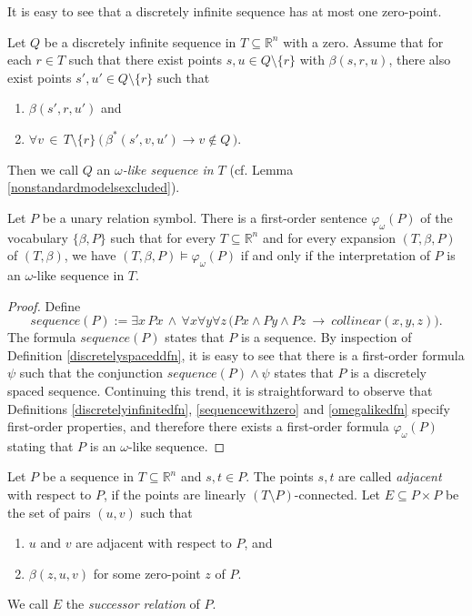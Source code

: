 \documentclass{LMCS}
\theoremstyle{plain}
\newcommand{\rp}{(\mathbb{R}^n,\beta)}
\newcommand{\rsq}{\mathbb{R}^n}
\newcommand{\mi}{\mathit}
\begin{document}
%
It is easy to see that a discretely infinite sequence has at most one zero-point.
%


%
\begin{defi}\label{omegalikedfn}
%
Let $Q$ be a discretely infinite sequence in $T\subseteq\rsq$ with a zero.
%
Assume that for each $r\in T$ such that there exist points $s,u\in Q\setminus\{r\}$
%
with $\beta(s,r,u)$, there also exist points $s',u'\in Q\setminus\{r\}$ such that
%
\begin{enumerate}
%
\item
$\beta(s',r,u')$ and
%
\item
$\forall v\, \in\, T\setminus\{r\}\ \bigl(\, \beta^*(s',v,u')\rightarrow v\not\in Q\, \bigr)$.
%
\end{enumerate}
%
%
%
Then we call $Q$ an \emph{$\omega$-like sequence in $T$} (cf. Lemma \ref{nonstandardmodelsexcluded}).
%
\end{defi}
%
%
%
%
%
%
\begin{lem}\label{omegalikesequencedefinability}
%
Let $P$ be a unary relation symbol. There is a first-order sentence $\varphi_{\omega}(P)$ of the vocabulary $\{\beta,P\}$ such that
%
for every $T\subseteq \rsq$ and for every expansion $(T,\beta,P)$ of $(T,\beta)$, we have $(T,\beta,P)\models\varphi_{\omega}(P)$ if and only if the
%
interpretation of $P$ is an $\omega$-like sequence in $T$.  
%
\end{lem}
%
%
%
\begin{proof} 
%
%
%
Define
%
%
%
\[
%
\mi{sequence}(P):=\exists x\, Px\,
%
\wedge\, \forall x\forall y\forall z\,
%
\bigl(Px\wedge Py \wedge Pz\ \rightarrow\ \mi{collinear}(x,y,z)\bigr).
%
\]
%
%
%
The formula $sequence(P)$ states that $P$ is a sequence. By inspection of Definition \ref{discretelyspaceddfn}, it is
%
easy to see that there is a first-order formula $\psi$ such that the conjunction $sequence(P)\wedge\psi$ states
%
that $P$ is a discretely spaced sequence. Continuing this trend, it is straightforward to observe
%
that Definitions \ref{discretelyinfinitedfn}, \ref{sequencewithzero} and \ref{omegalikedfn} specify
%
first-order properties, and therefore there exists a first-order formula $\varphi_{\omega}(P)$ stating
%
that $P$ is an $\omega$-like sequence.
%
\end{proof}
%



%
\begin{defi}\label{successordefinition}
%
Let $P$ be a sequence in $T\subseteq \rsq$ and $s,t\in P$. The points $s,t$ are
%
called \emph{adjacent} with respect to $P$, if the
%
points are linearly $(T\setminus P)$-connected.
%
Let $E\subseteq P\times P$ be the set of pairs $(u,v)$ such that 
%
\begin{enumerate}
%
\item
$u$ and $v$ are adjacent with respect to $P$, and 
%
\item
$\beta(z,u,v)$ for some zero-point $z$ of $P$.
%
\end{enumerate}
%
We call $E$ the \emph{successor relation} of $P$.
%
\end{defi}
%
\end{document}
